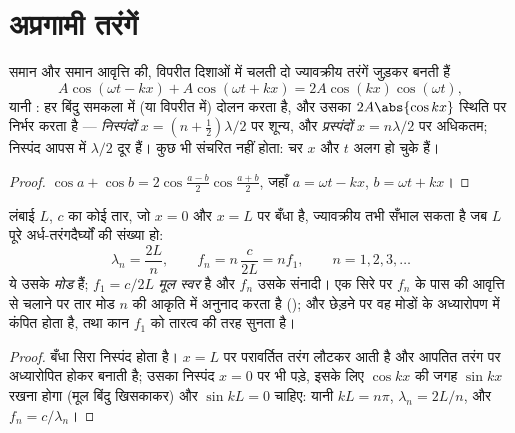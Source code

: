 \section{अप्रगामी तरंगें}

\begin{theorem}[अप्रगामी तरंग]\label{thm:b1:wave-propagation:standing}
समान  और समान आवृत्ति की, विपरीत दिशाओं में चलती दो ज्यावक्रीय तरंगें
जुड़कर बनती हैं
\[
A\cos(\omega t - kx) + A\cos(\omega t + kx) = 2A\cos(kx)\cos(\omega t),
\]
यानी \emph{}: हर बिंदु समकला में (या विपरीत  में) दोलन करता
है, और उसका  $2A\abs{\cos kx}$ स्थिति पर निर्भर करता है ---
\emph{निस्पंदों} $x = (n + \tfrac12)\lambda/2$ पर शून्य, और
\emph{प्रस्पंदों} $x = n\lambda/2$ पर अधिकतम; निस्पंद आपस में $\lambda/2$ दूर
हैं। कुछ भी संचरित नहीं होता: चर $x$ और $t$ अलग हो चुके हैं।
\end{theorem}

\begin{proof}
$\cos a + \cos b = 2\cos\frac{a - b}{2}\cos\frac{a + b}{2}$, जहाँ
$a = \omega t - kx$, $b = \omega t + kx$।
\end{proof}

\begin{proposition}[दोनों सिरों पर बँधे तार के मोड]\label{prop:b1:wave-propagation:modes}
लंबाई $L$,  $c$ का कोई तार, जो $x = 0$ और $x = L$ पर बँधा है,
ज्यावक्रीय  तभी सँभाल सकता है जब $L$ पूरे अर्ध-तरंगदैर्घ्यों की
संख्या हो:
\[
\lambda_n = \frac{2L}{n}, \qquad f_n = n\,\frac{c}{2L} = n f_1,
\qquad n = 1, 2, 3, \dots
\]
ये उसके \emph{मोड} हैं; $f_1 = c/2L$ \emph{मूल स्वर} है और
$f_n$ उसके संनादी। एक सिरे पर $f_n$ के पास की आवृत्ति से चलाने पर
तार मोड $n$ की आकृति में अनुनाद करता है (); और छेड़ने पर वह मोडों के अध्यारोपण में कंपित होता है, तथा
कान $f_1$ को तारत्व की तरह सुनता है।
\end{proposition}

\begin{proof}
बँधा सिरा निस्पंद होता है। $x = L$ पर परावर्तित तरंग लौटकर आती है और आपतित
तरंग पर अध्यारोपित होकर  बनाती है; उसका निस्पंद
$x = 0$ पर भी पड़े, इसके लिए $\cos kx$ की जगह $\sin kx$ रखना होगा (मूल बिंदु
खिसकाकर) और $\sin kL = 0$ चाहिए: यानी $kL = n\pi$, $\lambda_n = 2L/n$, और
$f_n = c/\lambda_n$।
\end{proof}

